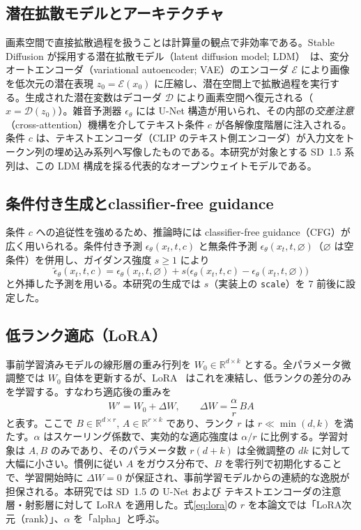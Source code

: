 \documentclass[10pt,twocolumn]{ltjsarticle}
\begin{document}
\subsection{潜在拡散モデルとアーキテクチャ}
画素空間で直接拡散過程を扱うことは計算量の観点で非効率である。Stable Diffusion が採用する潜在拡散モデル（latent diffusion model; LDM）~\cite{rombach2022ldm}は、変分オートエンコーダ（variational autoencoder; VAE）のエンコーダ $\mathcal{E}$ により画像を低次元の潜在表現 $z_0=\mathcal{E}(x_0)$ に圧縮し、潜在空間上で拡散過程を実行する。生成された潜在変数はデコーダ $\mathcal{D}$ により画素空間へ復元される（$\hat{x}=\mathcal{D}(z_0)$）。雑音予測器 $\epsilon_\theta$ には U-Net 構造が用いられ、その内部の\emph{交差注意}（cross-attention）機構を介してテキスト条件 $c$ が各解像度階層に注入される。条件 $c$ は、テキストエンコーダ（CLIP のテキスト側エンコーダ）が入力文をトークン列の埋め込み系列へ写像したものである。本研究が対象とする SD~1.5 系列は、この LDM 構成を採る代表的なオープンウェイトモデルである。

\subsection{条件付き生成とclassifier-free guidance}
条件 $c$ への追従性を強めるため、推論時には classifier-free guidance（CFG）が広く用いられる。条件付き予測 $\epsilon_\theta(x_t,t,c)$ と無条件予測 $\epsilon_\theta(x_t,t,\varnothing)$（$\varnothing$ は空条件）を併用し、ガイダンス強度 $s\ge 1$ により
\begin{equation}
\tilde\epsilon_\theta(x_t,t,c)=\epsilon_\theta(x_t,t,\varnothing)+s\big(\epsilon_\theta(x_t,t,c)-\epsilon_\theta(x_t,t,\varnothing)\big)
\end{equation}
と外挿した予測を用いる。本研究の生成では $s$（実装上の \texttt{scale}）を $7$ 前後に設定した。

\subsection{低ランク適応（LoRA）}
事前学習済みモデルの線形層の重み行列を $W_0\in\mathbb{R}^{d\times k}$ とする。全パラメータ微調整では $W_0$ 自体を更新するが、LoRA~\cite{hu2022lora} はこれを凍結し、低ランクの差分のみを学習する。すなわち適応後の重みを
\begin{equation}
W' = W_0 + \Delta W,\qquad \Delta W=\frac{\alpha}{r}\,B A
\label{eq:lora}
\end{equation}
と表す。ここで $B\in\mathbb{R}^{d\times r}$, $A\in\mathbb{R}^{r\times k}$ であり、ランク $r$ は $r\ll\min(d,k)$ を満たす。$\alpha$ はスケーリング係数で、実効的な適応強度は $\alpha/r$ に比例する。学習対象は $A,B$ のみであり、そのパラメータ数 $r(d+k)$ は全微調整の $dk$ に対して大幅に小さい。慣例に従い $A$ をガウス分布で、$B$ を零行列で初期化することで、学習開始時に $\Delta W=0$ が保証され、事前学習モデルからの連続的な逸脱が担保される。本研究では SD~1.5 の U-Net および テキストエンコーダの注意層・射影層に対して LoRA を適用した。式\eqref{eq:lora}の $r$ を本論文では「LoRA次元（rank）」、$\alpha$ を「alpha」と呼ぶ。
\end{document}
